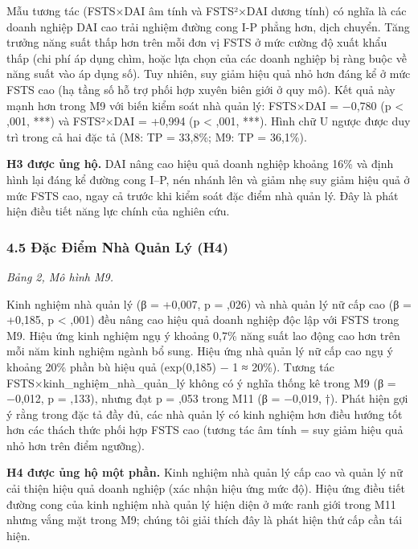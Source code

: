 \documentclass[12pt,a4paper]{article}
\begin{document}
Mẫu tương tác (FSTS×DAI âm tính và FSTS²×DAI dương tính) có nghĩa là các
doanh nghiệp DAI cao trải nghiệm đường cong I-P phẳng hơn, dịch chuyển.
Tăng trưởng năng suất thấp hơn trên mỗi đơn vị FSTS ở mức cường độ xuất
khẩu thấp (chi phí áp dụng chìm, hoặc lựa chọn của các doanh nghiệp bị
ràng buộc về năng suất vào áp dụng số). Tuy nhiên, suy giảm hiệu quả nhỏ
hơn đáng kể ở mức FSTS cao (hạ tầng số hỗ trợ phối hợp xuyên biên giới ở
quy mô). Kết quả này mạnh hơn trong M9 với biến kiểm soát nhà quản lý:
FSTS×DAI = −0,780 (p \textless{} ,001, ***) và FSTS²×DAI = +0,994 (p
\textless{} ,001, ***). Hình chữ U ngược được duy trì trong cả hai đặc
tả (M8: TP = 33,8\%; M9: TP = 36,1\%).

\textbf{H3 được ủng hộ.} DAI nâng cao hiệu quả doanh nghiệp khoảng 16\%
và định hình lại đáng kể đường cong I--P, nén nhánh lên và giảm nhẹ suy
giảm hiệu quả ở mức FSTS cao, ngay cả trước khi kiểm soát đặc điểm nhà
quản lý. Đây là phát hiện điều tiết năng lực chính của nghiên cứu.

\hypertarget{45-ux111ux1eb7c-ux111iux1ec3m-nhuxe0-quux1ea3n-luxfd-h4}{%
\subsubsection{4.5 Đặc Điểm Nhà Quản Lý
(H4)}\label{45-ux111ux1eb7c-ux111iux1ec3m-nhuxe0-quux1ea3n-luxfd-h4}}

\emph{Bảng 2, Mô hình M9.}

Kinh nghiệm nhà quản lý (β = +0,007, p = ,026) và nhà quản lý nữ cấp cao
(β = +0,185, p \textless{} ,001) đều nâng cao hiệu quả doanh nghiệp độc
lập với FSTS trong M9. Hiệu ứng kinh nghiệm ngụ ý khoảng 0,7\% năng suất
lao động cao hơn trên mỗi năm kinh nghiệm ngành bổ sung. Hiệu ứng nhà
quản lý nữ cấp cao ngụ ý khoảng 20\% phần bù hiệu quả (exp(0,185) − 1 ≈
20\%). Tương tác FSTS×kinh\_nghiệm\_nhà\_quản\_lý không có ý nghĩa thống
kê trong M9 (β = −0,012, p = ,133), nhưng đạt p = ,053 trong M11 (β =
−0,019, †). Phát hiện gợi ý rằng trong đặc tả đầy đủ, các nhà quản lý có
kinh nghiệm hơn điều hướng tốt hơn các thách thức phối hợp FSTS cao
(tương tác âm tính = suy giảm hiệu quả nhỏ hơn trên điểm ngưỡng).

\textbf{H4 được ủng hộ một phần.} Kinh nghiệm nhà quản lý cấp cao và
quản lý nữ cải thiện hiệu quả doanh nghiệp (xác nhận hiệu ứng mức độ).
Hiệu ứng điều tiết đường cong của kinh nghiệm nhà quản lý hiện diện ở
mức ranh giới trong M11 nhưng vắng mặt trong M9; chúng tôi giải thích
đây là phát hiện thứ cấp cần tái hiện.
\end{document}
